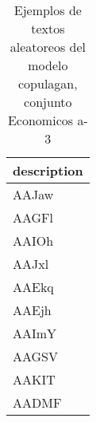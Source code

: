 \begin{table}[H]
\centering
\fontsize{8}{14}\selectfont
\caption{Ejemplos de textos aleatoreos del modelo copulagan, conjunto Economicos a-3}
\label{table-sample10-economicos-a-3-copulagan-text}
\begin{tabular}{|m{50em}|}
\hline
\rowcolor[gray]{0.8}
description \\
\hline AAJaw \\
\hline AAGFl \\
\hline AAIOh \\
\hline AAJxl \\
\hline AAEkq \\
\hline AAEjh \\
\hline AAImY \\
\hline AAGSV \\
\hline AAKIT \\
\hline AADMF \\
\hline
\end{tabular}
\end{table}
